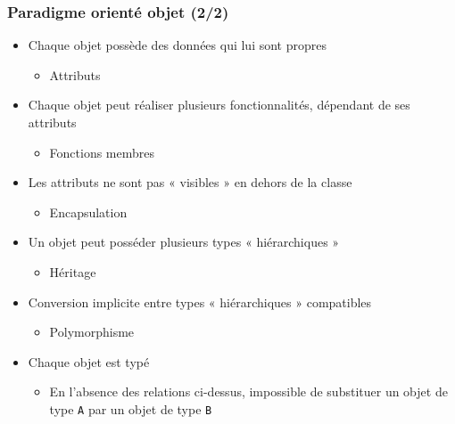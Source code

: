 \begin{frame}
\frametitle{Paradigme orienté objet (2/2)}
\begin{itemize}[<+->]
\item Chaque objet possède des données qui lui sont propres
	\begin{itemize}
	\item Attributs
	\end{itemize}
\item Chaque objet peut réaliser plusieurs fonctionnalités, dépendant de ses attributs
	\begin{itemize}
	\item Fonctions membres
	\end{itemize}
\item Les attributs ne sont pas « visibles » en dehors de la classe
	\begin{itemize}
	\item Encapsulation
	\end{itemize}
\item Un objet peut posséder plusieurs types « hiérarchiques »
	\begin{itemize}
	\item Héritage
	\end{itemize}
\item Conversion implicite entre types « hiérarchiques » compatibles
	\begin{itemize}
	\item Polymorphisme
	\end{itemize}
\item Chaque objet est typé
	\begin{itemize}
	\item En l'absence des relations ci-dessus, impossible de substituer un objet de type \texttt{A} par un objet de type \texttt{B}
	\end{itemize}
\end{itemize}
\end{frame}


